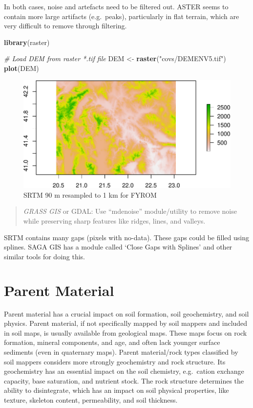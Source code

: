 \documentclass[10pt,b5paper,]{book}
\newenvironment{Shaded}{\begin{snugshade}}{\end{snugshade}}
\newcommand{\CommentTok}[1]{\textcolor[rgb]{0.56,0.35,0.01}{\textit{#1}}}
\newcommand{\KeywordTok}[1]{\textcolor[rgb]{0.13,0.29,0.53}{\textbf{#1}}}
\newcommand{\NormalTok}[1]{#1}
\newcommand{\StringTok}[1]{\textcolor[rgb]{0.31,0.60,0.02}{#1}}
\theoremstyle{definition}
\theoremstyle{definition}
\theoremstyle{definition}
\theoremstyle{remark}
\begin{document}
In both cases, noise and artefacts need to be filtered out. ASTER seems
to contain more large artifacts (e.g.~peaks), particularly in flat
terrain, which are very difficult to remove through filtering.

\begin{Shaded}
\begin{Highlighting}[]
\KeywordTok{library}\NormalTok{(raster)}

\CommentTok{# Load DEM from raster *.tif file}
\NormalTok{DEM <-}\StringTok{ }\KeywordTok{raster}\NormalTok{(}\StringTok{"covs/DEMENV5.tif"}\NormalTok{)}
\KeywordTok{plot}\NormalTok{(DEM)}
\end{Highlighting}
\end{Shaded}

\begin{figure}
\centering
\includegraphics{SOCMapping_files/figure-latex/unnamed-chunk-18-1.pdf}
\caption{\label{fig:unnamed-chunk-18}SRTM 90 m resampled to 1 km for FYROM}
\end{figure}

\begin{quote}
\emph{GRASS GIS} or GDAL: Use ``mdenoise'' module/utility to remove
noise while preserving sharp features like ridges, lines, and valleys.
\end{quote}

SRTM contains many gaps (pixels with no-data). These gaps could be
filled using splines. SAGA GIS has a module called `Close Gaps with
Splines' and other similar tools for doing this.

\hypertarget{parent-material}{%
\section{Parent Material}\label{parent-material}}

Parent material has a crucial impact on soil formation, soil
geochemistry, and soil physics. Parent material, if not specifically
mapped by soil mappers and included in soil maps, is usually available
from geological maps. These maps focus on rock formation, mineral
components, and age, and often lack younger surface sediments (even in
quaternary maps). Parent material/rock types classified by soil mappers
considers more strongly geochemistry and rock structure. Its
geochemistry has an essential impact on the soil chemistry, e.g.~cation
exchange capacity, base saturation, and nutrient stock. The rock
structure determines the ability to disintegrate, which has an impact on
soil physical properties, like texture, skeleton content, permeability,
and soil thickness.
\end{document}
